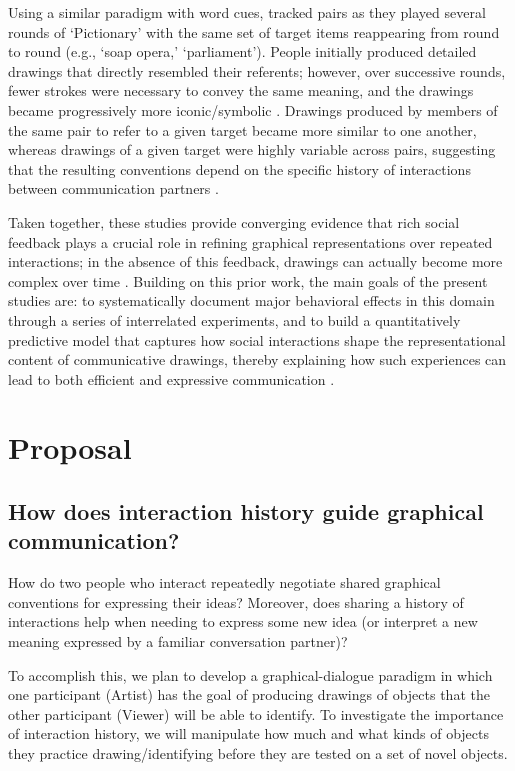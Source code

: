 \documentclass[12pt]{article}
\begin{document}
Using a similar paradigm with word cues, \cite{Fay:2010jh} tracked pairs as they played several rounds of `Pictionary' with the same set of target items reappearing from round to round (e.g., `soap opera,' `parliament'). People initially produced detailed drawings that directly resembled their referents; however, over successive rounds, fewer strokes were necessary to convey the same meaning, and the drawings became progressively more iconic/symbolic \cite{Garrod:2007wk}. Drawings produced by members of the same pair to refer to a given target became more similar to one another, whereas drawings of a given target were highly variable across pairs, suggesting that the resulting conventions depend on the specific history of interactions between communication partners \cite{Fay:2010jh}.

Taken together, these studies provide converging evidence that rich social feedback plays a crucial role in refining graphical representations over repeated interactions; in the absence of this feedback, drawings can actually become more complex over time \cite{Garrod:2007wk,Hupet:1992ua}. Building on this prior work, the main goals of the present studies are: to systematically document major behavioral effects in this domain through a series of interrelated experiments, and to build a quantitatively predictive model that captures how social interactions shape the representational content of communicative drawings, thereby explaining how such experiences can lead to both efficient and expressive communication \cite{Kirby:2015gi}. 

\section{Proposal}

\subsection{How does interaction history guide graphical communication?}

How do two people who interact repeatedly negotiate shared graphical conventions for expressing their ideas? Moreover, does sharing a history of interactions help when needing to express some new idea (or interpret a new meaning expressed by a familiar conversation partner)? 

To accomplish this, we plan to develop a graphical-dialogue paradigm in which one participant (Artist) has the goal of producing drawings of objects that the other participant (Viewer) will be able to identify. To investigate the importance of interaction history, we will manipulate how much and what kinds of objects they practice drawing/identifying before they are tested on a set of novel objects.
\end{document}
